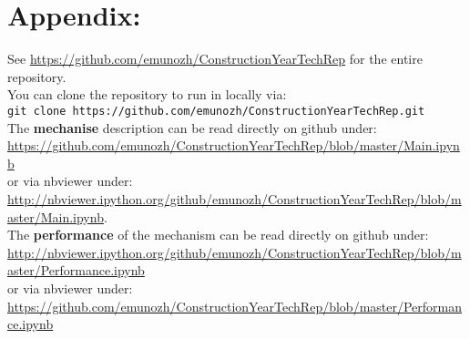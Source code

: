 \section{Appendix:}

See \url{https://github.com/emunozh/ConstructionYearTechRep} for the entire
repository.\\ 

You can clone the repository to run in locally via:\\
\verb|git clone https://github.com/emunozh/ConstructionYearTechRep.git|\\

The \textbf{mechanise} description can be read directly on github under:\\
\url{https://github.com/emunozh/ConstructionYearTechRep/blob/master/Main.ipynb}
\\
or via nbviewer under:\\
\url{http://nbviewer.ipython.org/github/emunozh/ConstructionYearTechRep/blob/master/Main.ipynb}.\\

The \textbf{performance} of the mechanism can be read directly on github
under:\\
\url{http://nbviewer.ipython.org/github/emunozh/ConstructionYearTechRep/blob/master/Performance.ipynb}
\\
or via nbviewer under:\\
\url{https://github.com/emunozh/ConstructionYearTechRep/blob/master/Performance.ipynb}
